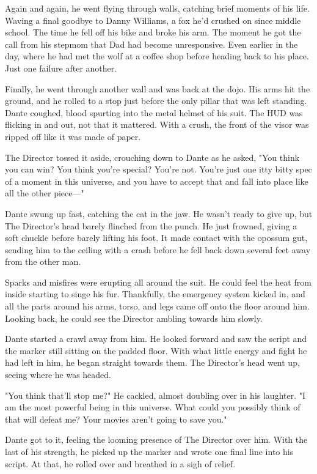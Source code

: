 Again and again, he went flying through walls, catching brief moments of his life. Waving a final goodbye to Danny Williams, a fox he'd crushed on since middle school. The time he fell off his bike and broke his arm. The moment he got the call from his stepmom that Dad had become unresponsive. Even earlier in the day, where he had met the wolf at a coffee shop before heading back to his place. Just one failure after another.

Finally, he went through another wall and was back at the dojo. His arms hit the ground, and he rolled to a stop just before the only pillar that was left standing. Dante coughed, blood spurting into the metal helmet of his suit. The HUD was flicking in and out, not that it mattered. With a crush, the front of the visor was ripped off like it was made of paper.

The Director tossed it aside, crouching down to Dante as he asked, "You think you can win? You think you're special? You're not. You're just one itty bitty spec of a moment in this universe, and you have to accept that and fall into place like all the other piece---"

Dante swung up fast, catching the cat in the jaw. He wasn't ready to give up, but The Director's head barely flinched from the punch. He just frowned, giving a soft chuckle before barely lifting his foot. It made contact with the opossum gut, sending him to the ceiling with a crash before he fell back down several feet away from the other man.

Sparks and misfires were erupting all around the suit. He could feel the heat from inside starting to singe his fur. Thankfully, the emergency system kicked in, and all the parts around his arms, torso, and legs came off onto the floor around him. Looking back, he could see the Director ambling towards him slowly.

Dante started a crawl away from him. He looked forward and saw the script and the marker still sitting on the padded floor. With what little energy and fight he had left in him, he began straight towards them. The Director's head went up, seeing where he was headed.

"You think that'll stop me?" He cackled, almost doubling over in his laughter. "I am the most powerful being in this universe. What could you possibly think of that will defeat me? Your movies aren't going to save you."

Dante got to it, feeling the looming presence of The Director over him. With the last of his strength, he picked up the marker and wrote one final line into his script. At that, he rolled over and breathed in a sigh of relief.

